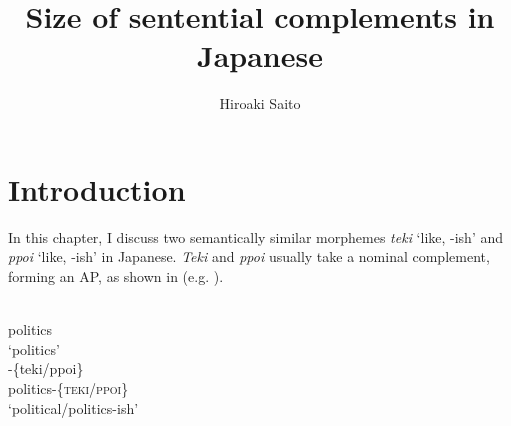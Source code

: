\documentclass[output=paper]{langscibook}
\author{Hiroaki Saito\affiliation{Mie University; University of Connecticut}}
\title{Size of sentential complements in Japanese}
\begin{document}
\maketitle

\section{Introduction}
In this chapter, I discuss two semantically similar morphemes \emph{teki} ‘like, -ish’ and \emph{ppoi} ‘like, -ish’ in Japanese.  \emph{Teki} and \emph{ppoi} usually take a nominal complement, forming an AP, as shown in  (e.g. \citealt{KaiserYamamoto2001}). 

\begin{multicols}{2}
\begin{exe}
\ex \label{saito1}
\begin{xlist}
\ex \label{saito1a}
\\ 
politics\\
\glt `politics'\\

\ex \label{saito1b}
-\{{teki/ppoi}\}\\
politics-\{\textsc{teki/ppoi}\}\\
\glt `political/politics-ish'
\end{xlist}
\end{exe}
\end{multicols}\pagebreak
\end{document}
